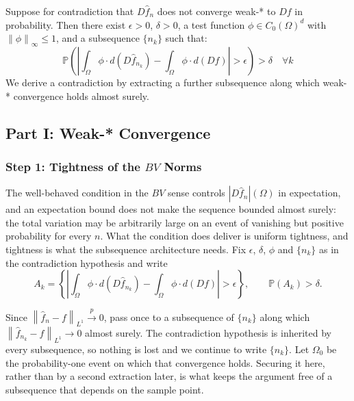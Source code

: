 \documentclass[12pt,a4paper]{article}
\numberwithin{equation}{section}
\theoremstyle{plain}
\theoremstyle{definition}
\newcommand{\norm}[1]{\left\| #1 \right\|}
\newcommand{\fn}{\hat{f}_n}
\newcommand{\xrightarrowp}{\xrightarrow{p}}
\newcommand{\Prob}{\mathbb{P}}
\begin{document}
	Suppose for contradiction that $D\fn$ does not converge weak-* to $Df$ in
	probability. Then there exist $\epsilon > 0$, $\delta > 0$, a test function
	$\phi \in C_0(\Omega)^d$ with $\norm{\phi}_\infty \leq 1$, and a subsequence
	$\{n_k\}$ such that:
	\begin{equation}
		\mathbb{P}\!\left(\left|
		\int_\Omega \phi \cdot d(D\hat{f}_{n_k})
		- \int_\Omega \phi \cdot d(Df)
		\right| > \epsilon\right) > \delta
		\quad \forall k
	\end{equation}
	We derive a contradiction by extracting a further subsequence along which
	weak-* convergence holds almost surely.
	
	\subsection{Part I: Weak-* Convergence}
	
	\subsubsection*{Step 1: Tightness of the $BV$ Norms}

	The well-behaved condition in the $BV$ sense controls $|D\fn|(\Omega)$ in
	expectation, and an expectation bound does not make the sequence bounded
	almost surely: the total variation may be arbitrarily large on an event of
	vanishing but positive probability for every $n$. What the condition does
	deliver is uniform tightness, and tightness is what the subsequence
	architecture needs. Fix $\epsilon$, $\delta$, $\phi$ and $\{n_k\}$ as in the
	contradiction hypothesis and write
	\begin{equation}
		A_k = \left\{\left|
		\int_\Omega \phi \cdot d(D\hat{f}_{n_k})
		- \int_\Omega \phi \cdot d(Df)\right| > \epsilon\right\},
		\qquad \Prob(A_k) > \delta .
	\end{equation}

	Since $\norm{\fn - f}_{L^1} \xrightarrowp 0$, pass once to a subsequence of
	$\{n_k\}$ along which $\norm{\hat{f}_{n_k} - f}_{L^1} \to 0$ almost surely.
	The contradiction hypothesis is inherited by every subsequence, so nothing
	is lost and we continue to write $\{n_k\}$. Let $\Omega_0$ be the
	probability-one event on which that convergence holds. Securing it here,
	rather than by a second extraction later, is what keeps the argument free of
	a subsequence that depends on the sample point.
\end{document}
